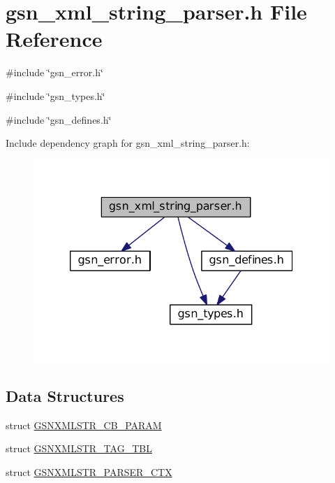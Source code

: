 \hypertarget{a00617}{
\section{gsn\_\-xml\_\-string\_\-parser.h File Reference}
\label{a00617}
}
{\ttfamily \#include \char`\"{}gsn\_\-error.h\char`\"{}}\par
{\ttfamily \#include \char`\"{}gsn\_\-types.h\char`\"{}}\par
{\ttfamily \#include \char`\"{}gsn\_\-defines.h\char`\"{}}\par
Include dependency graph for gsn\_\-xml\_\-string\_\-parser.h:
\nopagebreak
\begin{figure}[H]
\begin{center}
\leavevmode
\includegraphics[width=320pt]{a00867}
\end{center}
\end{figure}
\subsection*{Data Structures}
\begin{DoxyCompactItemize}
\item 
struct \hyperlink{a00443}{GSNXMLSTR\_\-CB\_\-PARAM}
\item 
struct \hyperlink{a00445}{GSNXMLSTR\_\-TAG\_\-TBL}
\item 
struct \hyperlink{a00444}{GSNXMLSTR\_\-PARSER\_\-CTX}
\end{DoxyCompactItemize}
